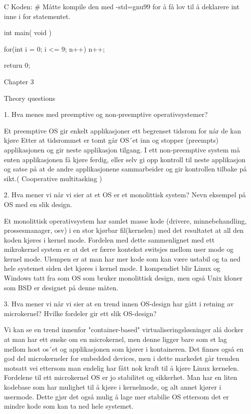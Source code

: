 C Koden: # Måtte kompile den med -std=gnu99 for å få lov til å deklarere int inne i for statementet.

int main( void ) {

	for(int i = 0; i <= 9; n++){
		n++;
	}

return 0;

}

Chapter 3

Theory questions

1. Hva menes med preemptive og non-preemptive operativsystemer?

Et preemptive OS gir enkelt applikasjoner ett begrenset tidsrom for når de kan kjøre Etter at tidsrommet er tomt går OS´et inn og stopper (preempts) applikasjonen og gir neste applikasjon tilgang. I ett non-preemptive system må enten applikasjonen få kjøre ferdig, eller selv gi opp kontroll til neste applikasjon og satse på at de andre applikasjonene sammarbeider og gir kontrollen tilbake på sikt.( Cooperative multitasking )

2. Hva mener vi når vi sier at et OS er et monolittisk system? Nevn eksempel på OS med en slik design.

Et monolittisk operativsystem har samlet masse kode (drivere, minnebehandling, prossesmanager, osv) i en stor kjørbar fil(kernelen) med det resultatet at all den koden kjøres i kernel mode. Fordelen med dette sammenlignet med ett mikrokernel system er at det er færre kontekst switsjes mellom user mode og kernel mode. Ulempen er at man har mer kode som kan være ustabil og ta ned hele systemet siden det kjøres i kernel mode.
I kompendiet blir Linux og Windows tatt fra som OS som bruker monolittisk design, men også Unix kloner som BSD er designet på denne måten.
 
3. Hva mener vi når vi sier at en trend innen OS-design har gått i retning av microkernel? Hvilke fordeler gir ett slik OS-design?

Vi kan se en trend innenfor "container-based" virtualiseringsløsninger alá docker at man har ett ønske om en microkernel, men denne ligger bare som et lag mellom host os´et og applikasjonen som kjører i kontaineren. Det finnes også en god del microkerneler for embedded devices, men i dette markedet går trenden motsatt vei ettersom man endelig har fått nok kraft til å kjøre Linux kernelen. Fordelene til ett microkernel OS er jo stabilitet og sikkerhet. Man har en liten kodebase som har mulighet til å kjøre i kernelmode, og alt annet kjører i usermode. Dette gjør det også mulig å lage mer stabilie OS ettersom det er mindre kode som kan ta ned hele systemet.

